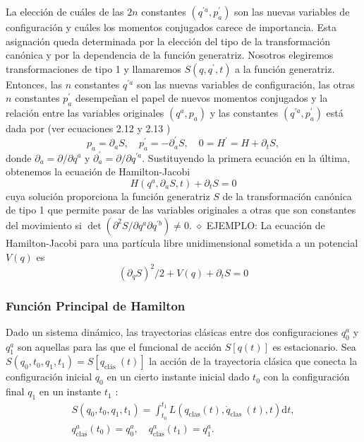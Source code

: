 La elección de cuáles de las $2 n$ constantes $\left(q^{\prime a}, p_{a}^{\prime}\right)$ son las nuevas variables de configuración y cuáles los momentos conjugados carece de importancia. Esta asignación queda determinada por la elección del tipo de la transformación canónica y por la dependencia de la función generatriz. Nosotros elegiremos transformaciones de tipo 1 y llamaremos $S\left(q, q^{\prime}, t\right)$ a la función generatriz. Entonces, las $n$ constantes $q^{\prime a}$ son las nuevas variables de configuración, las otras $n$ constantes $p_{a}^{\prime}$ desempeñan el papel de nuevos momentos conjugados y la relación entre las variables originales $\left(q^{a}, p_{a}\right)$ y las constantes $\left(q^{\prime a}, p_{a}^{\prime}\right)$ está dada por (ver ecuaciones 2.12 y 2.13 )
$$
p_{a}=\partial_{a} S, \quad p_{a}^{\prime}=-\partial_{a}^{\prime} S, \quad 0=H^{\prime}=H+\partial_{t} S,
$$
donde $\partial_{a}=\partial / \partial q^{a}$ y $\partial_{a}^{\prime}=\partial / \partial q^{\prime a}$. Sustituyendo la primera ecuación en la última, obtenemos la ecuación de Hamilton-Jacobi
$$
H\left(q^{a}, \partial_{a} S, t\right)+\partial_{t} S=0
$$
cuya solución proporciona la función generatriz $S$ de la transformación canónica de tipo 1 que permite pasar de las variables originales a otras que son constantes del movimiento si $\operatorname{det}\left(\partial^{2} S / \partial q^{a} \partial q^{\prime b}\right) \neq 0$.
$\diamond$ EJEMPLO: La ecuación de Hamilton-Jacobi para una partícula libre unidimensional sometida a un potencial $V(q)$ es
$$
\left(\partial_{q} S\right)^{2} / 2+V(q)+\partial_{t} S=0
$$
\subsubsection{Función Principal de Hamilton}

Dado un sistema dinámico, las trayectorias clásicas entre dos configuraciones $q_{0}^{a}$ y $q_{1}^{a}$ son aquellas para las que el funcional de acción $S[q(t)]$ es estacionario. Sea $S\left(q_{0}, t_{0}, q_{1}, t_{1}\right)=S\left[q_{\text {clás }}(t)\right]$ la acción de la trayectoria clásica que conecta la configuración inicial $q_{0}$ en un cierto instante inicial dado $t_{0}$ con la configuración final $q_{1}$ en un instante $t_{1}$ :
$$
\begin{gathered}
S\left(q_{0}, t_{0}, q_{1}, t_{1}\right)=\int_{t_{0}}^{t_{1}} L\left(q_{\mathrm{clas}}(t), \dot{q}_{\text {clas }}(t), t\right) \mathrm{d} t, \\
q_{\mathrm{clas}}^{a}\left(t_{0}\right)=q_{0}^{a}, \quad q_{\mathrm{clas}}^{a}\left(t_{1}\right)=q_{1}^{a} .
\end{gathered}
$$

